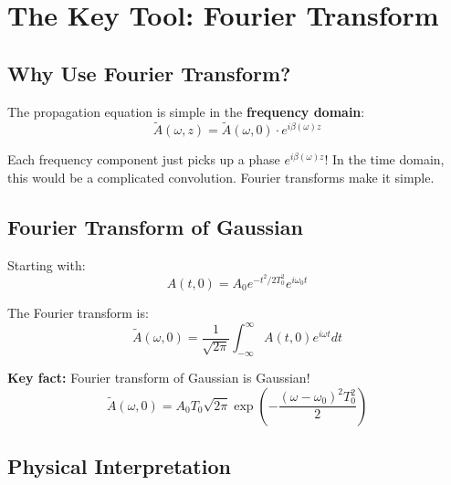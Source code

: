 \documentclass[12pt]{article}
\begin{document}
\section{The Key Tool: Fourier Transform}

\subsection{Why Use Fourier Transform?}

The propagation equation is simple in the \textbf{frequency domain}:
$$\tilde{A}(\omega, z) = \tilde{A}(\omega, 0) \cdot e^{i\beta(\omega)z}$$

Each frequency component just picks up a phase $e^{i\beta(\omega)z}$!
In the time domain, this would be a complicated convolution. Fourier transforms make it simple.

\subsection{Fourier Transform of Gaussian}

Starting with:
$$A(t, 0) = A_0 e^{-t^2/2T_0^2} e^{i\omega_0 t}$$

The Fourier transform is:
\begin{equation}
\tilde{A}(\omega, 0) = \frac{1}{\sqrt{2\pi}} \int_{-\infty}^\infty A(t,0) e^{i\omega t} dt
\end{equation}

\textbf{Key fact:} Fourier transform of Gaussian is Gaussian!
\begin{equation}
\boxed{\tilde{A}(\omega, 0) = A_0 T_0 \sqrt{2\pi} \exp\left(-\frac{(\omega - \omega_0)^2 T_0^2}{2}\right)}
\end{equation}

\subsection{Physical Interpretation}

\begin{center}
\end{center}
\end{document}
